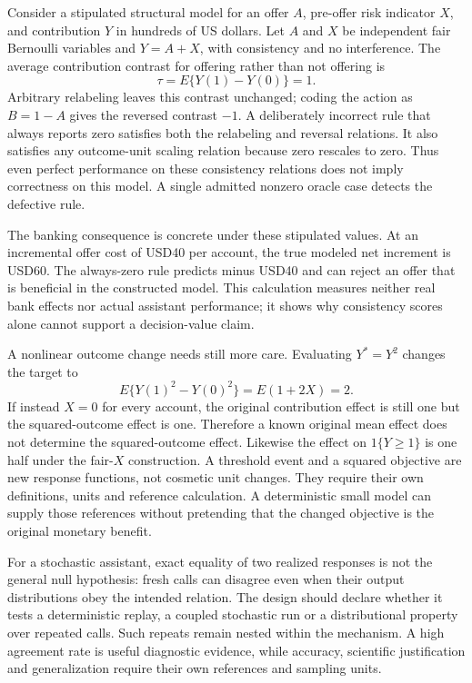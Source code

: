 Consider a stipulated structural model for an offer \(A\), pre-offer risk
indicator \(X\), and contribution \(Y\) in hundreds of US dollars. Let \(A\)
and \(X\) be independent fair Bernoulli variables and \(Y=A+X\), with
consistency and no interference. The average contribution contrast for
offering rather than not offering is
\[
       \tau=E\{Y(1)-Y(0)\}=1.
\]
Arbitrary relabeling leaves this contrast unchanged; coding the action as
\(B=1-A\) gives the reversed contrast \(-1\). A deliberately incorrect
rule that always reports zero satisfies both the relabeling and reversal
relations. It also satisfies any outcome-unit scaling relation because
zero rescales to zero. Thus even perfect performance on these consistency
relations does not imply correctness on this model. A single admitted
nonzero oracle case detects the defective rule.

The banking consequence is concrete under these stipulated values. At an
incremental offer cost of USD40 per account, the true modeled net increment
is USD60. The always-zero rule predicts minus USD40 and can reject an offer
that is beneficial in the constructed model. This calculation measures
neither real bank effects nor actual assistant performance; it shows why
consistency scores alone cannot support a decision-value claim.
\citep{exec14_l7_exact}

A nonlinear outcome change needs still more care. Evaluating
\(Y^*=Y^2\) changes the target to
\[
 E\{Y(1)^2-Y(0)^2\}=E(1+2X)=2.
\]
If instead \(X=0\) for every account, the original contribution effect is
still one but the squared-outcome effect is one. Therefore a known original
mean effect does not determine the squared-outcome effect. Likewise the
effect on \(1\{Y\geq1\}\) is one half under the fair-\(X\) construction.
A threshold event and a squared objective are new response functions, not
cosmetic unit changes. They require their own definitions, units and
reference calculation. A deterministic small model can supply those
references without pretending that the changed objective is the original
monetary benefit.

For a stochastic assistant, exact equality of two realized responses is not
the general null hypothesis: fresh calls can disagree even when their output
distributions obey the intended relation. The design should declare whether
it tests a deterministic replay, a coupled stochastic run or a distributional
property over repeated calls. Such repeats remain nested within the
mechanism. A high agreement rate is useful diagnostic evidence, while
accuracy, scientific justification and generalization require their own
references and sampling units.

